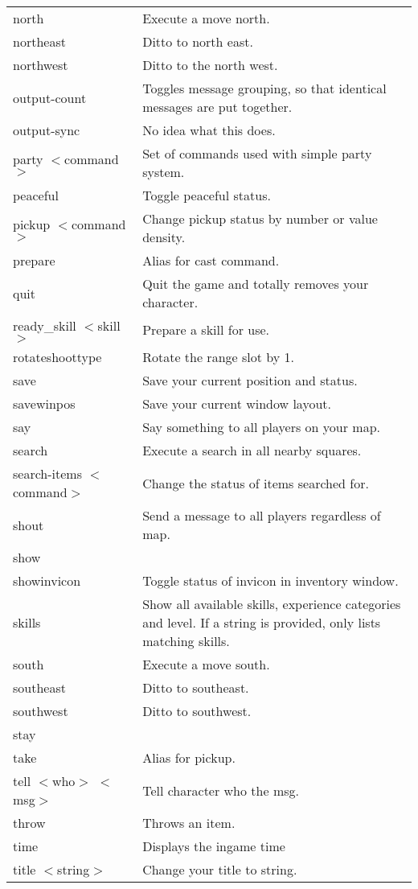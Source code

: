 {\begin{longtable}{p{4cm}p{9cm}}
north & Execute a move north. \\
northeast & Ditto to north east. \\
northwest & Ditto to the north west. \\
output-count & Toggles message grouping, so that identical messages are put together. \\
output-sync &  No idea what this does. \\
party $<$command$>$ & Set of commands used with simple party system. \\
peaceful & Toggle peaceful status. \\
pickup $<$command$>$ & Change pickup status by number or value density. \\
prepare & Alias for cast command. \\
quit & Quit the game and totally removes your character. \\
ready\_skill $<$skill$>$ & Prepare a skill for use. \\
rotateshoottype & Rotate the range slot by 1. \\
save & Save your current position and status. \\
savewinpos & Save your current window layout. \\
say & Say something to all players on your map. \\
search & Execute a search in all nearby squares.\\
search-items $<$command$>$ & Change the status of items searched for. \\
shout & Send a message to all players regardless of map.\\
show & \\
showinvicon & Toggle status of invicon in inventory window. \\
skills & Show all available skills, experience categories and level. If a string is provided, only lists matching skills.\\
south & Execute a move south.\\
southeast & Ditto to southeast. \\
southwest & Ditto to southwest. \\
stay & \\
take & Alias for pickup. \\
tell $<$who$>$ $<$msg$>$ & Tell character who the msg. \\
throw & Throws an item. \\
time & Displays the ingame time \\
title $<$string$>$ & Change your title to string.\\

\end{longtable}}
